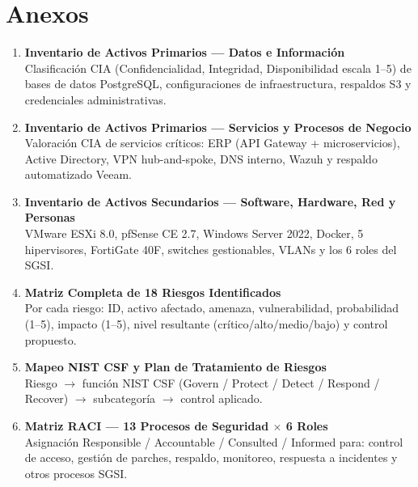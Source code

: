 \documentclass[11pt, a4paper, oneside]{report}
\begin{document}

\chapter*{Anexos}

\begin{enumerate}[label=\textbf{Anexo \Alph*.},leftmargin=4cm,labelsep=0.4cm,itemsep=14pt]

  \item {}\label{anex:activos_datos}
  \textbf{Inventario de Activos Primarios --- Datos e Información}\\
  Clasificación CIA (Confidencialidad, Integridad, Disponibilidad escala 1--5) de bases de datos
  PostgreSQL, configuraciones de infraestructura, respaldos S3 y credenciales administrativas.

  \item {}\label{anex:activos_servicios}
  \textbf{Inventario de Activos Primarios --- Servicios y Procesos de Negocio}\\
  Valoración CIA de servicios críticos: ERP (API Gateway + microservicios), Active Directory,
  VPN hub-and-spoke, DNS interno, Wazuh y respaldo automatizado Veeam.

  \item {}\label{anex:activos_secundarios}
  \textbf{Inventario de Activos Secundarios --- Software, Hardware, Red y Personas}\\
  VMware ESXi 8.0, pfSense CE 2.7, Windows Server 2022, Docker, 5 hipervisores,
  FortiGate 40F, switches gestionables, VLANs y los 6 roles del SGSI.

  \item {}\label{anex:matriz_riesgos}
  \textbf{Matriz Completa de 18 Riesgos Identificados}\\
  Por cada riesgo: ID, activo afectado, amenaza, vulnerabilidad, probabilidad (1--5),
  impacto (1--5), nivel resultante (crítico/alto/medio/bajo) y control propuesto.

  \item {}\label{anex:nist_tratamiento}
  \textbf{Mapeo NIST CSF y Plan de Tratamiento de Riesgos}\\
  Riesgo $\to$ función NIST CSF (Govern / Protect / Detect / Respond / Recover)
  $\to$ subcategoría $\to$ control aplicado.

  \item {}\label{anex:raci}
  \textbf{Matriz RACI --- 13 Procesos de Seguridad $\times$ 6 Roles}\\
  Asignación Responsible / Accountable / Consulted / Informed para: control de acceso,
  gestión de parches, respaldo, monitoreo, respuesta a incidentes y otros procesos SGSI.

\end{enumerate}

\renewcommand{\bibname}{Referencias Bibliográficas}

\end{document}
